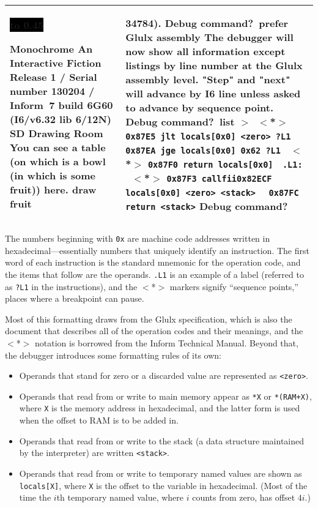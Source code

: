 \documentclass{book}
\newcommand{\n}{\hspace*{\fill}\newline}
\newcommand{\terp}[2]{\begin{center}\begin{tabular}{p{0.45\textwidth}|p{0.45\textwidth}}\midrule #1&#2\\\midrule\end{tabular}\end{center}}
\newcommand{\glkheading}[1]{\textbf{#1}}
\newcommand{\glkinput}[1]{\textbf{#1}}
\newcommand{\glkstatusline}[2]{\centerline{\colorbox{black}{\hbox to 0.45\textwidth{\textcolor{white}{#1\hfil #2}}}}}
\newcommand{\storyprompt}{\raisebox{1.5pt}{\(>\)}}
\newcommand{\cursor}{\raisebox{-1.5pt}{\RectangleThin}}
\newcommand{\markeddip}{\(>\)\ }
\newcommand{\unmarkeddip}{\hphantom{\(>\)}\ }
\begin{document}
\terp{\glkstatusline{Drawing Room}{0/1}\n
  \glkheading{Monochrome}\n
  An Interactive Fiction\n
  Release 1 / Serial number 130204 / Inform~7 build 6G60 (I6/v6.32 lib 6/12N) SD\n
  \n
  \glkheading{Drawing Room}\n
  You can see a table (on which is a bowl (in which is some fruit)) here.\n
  \n
  \storyprompt\glkinput{draw fruit}}{%
  34784).\n
  \n
  Debug command?\ \glkinput{prefer Glulx assembly}\n
  \n
  The debugger will now show all information except listings by line number at the Glulx assembly level.  "Step" and "next" will advance by I6 line unless asked to advance by sequence point.\n
  \n
  Debug command?\ \glkinput{list}\n
  \n
  \markeddip \(<\)*\(>\) \lstinline{0x87E5 jlt locals[0x0] <zero> ?L1}\n
  \unmarkeddip \hphantom{\(<\)*\(>\)} \lstinline{0x87EA jge locals[0x0] 0x62 ?L1}\n
  \unmarkeddip \(<\)*\(>\) \lstinline{0x87F0 return locals[0x0]}\n
  \unmarkeddip \lstinline{.L1:}\n
  \unmarkeddip \(<\)*\(>\) \lstinline @0x87F3 callfii@\hfill\lstinline @0x82ECF locals[0x0] <zero> <stack>@\n
  \unmarkeddip \hphantom{\(<\)*\(>\)} \lstinline{0x87FC return <stack>}\n
  \n
  Debug command?\ \cursor}

The numbers beginning with \lstinline{0x} are machine code addresses written in
hexadecimal---essentially numbers that uniquely identify an instruction.  The
first word of each instruction is the standard mnemonic for the operation code,
and the items that follow are the operands.  \lstinline{.L1} is an example of a
label (referred to as \lstinline{?L1} in the instructions), and the \(<\)*\(>\)
markers signify ``sequence points,'' places where a breakpoint can pause.

Most of this formatting draws from the Glulx specification, which is also the
document that describes all of the operation codes and their meanings, and the
\(<\)*\(>\) notation is borrowed from the Inform Technical Manual.  Beyond that,
the debugger introduces some formatting rules of its own:

\begin{itemize}
  \item{Operands that stand for zero or a discarded value are represented as
    \lstinline{<zero>}.}
  \item{Operands that read from or write to main memory appear as \lstinline{*X}
    or \lstinline{*(RAM+X)}, where \lstinline{X} is the memory address in
    hexadecimal, and the latter form is used when the offset to RAM is to be
    added in.}
  \item{Operands that read from or write to the stack (a data structure
    maintained by the interpreter) are written \lstinline{<stack>}.}
  \item{Operands that read from or write to temporary named values are shown as
    \lstinline{locals[X]}, where \lstinline{X} is the offset to the variable in
    hexadecimal.  (Most of the time the \(i\)th temporary named value, where
    \(i\) counts from zero, has offset \(4i\).)}
\end{itemize}
\end{document}
